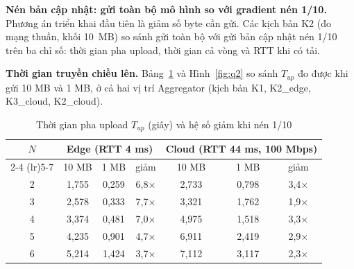 \textbf{Nén bản cập nhật: gửi toàn bộ mô hình so với gradient nén 1/10.} Phương án triển khai đầu tiên là giảm số byte cần gửi. Các kịch bản K2 (đo mạng thuần, khối 10~MB) so sánh gửi toàn bộ với gửi bản cập nhật nén 1/10 trên ba chỉ số: thời gian pha upload, thời gian cả vòng và RTT khi có tải.

\textbf{Thời gian truyền chiều lên.} Bảng~\ref{tab:q2meas} và Hình~\ref{fig:q2} so sánh $T_{up}$ đo được khi gửi 10 MB và 1 MB, ở cả hai vị trí Aggregator (kịch bản K1, K2\_edge, K3\_cloud, K2\_cloud).

\begin{table}[H]
    \centering
    \caption{Thời gian pha upload $T_{up}$ (giây) và hệ số giảm khi nén 1/10}
    \label{tab:q2meas}
    \begin{tabular}{c c c c c c c}
        \toprule
        \multirow{2}{*}{$N$} & \multicolumn{3}{c}{\textbf{Edge (RTT 4 ms)}} & \multicolumn{3}{c}{\textbf{Cloud (RTT 44 ms, 100 Mbps)}} \\
        \cmidrule(lr){2-4} \cmidrule(lr){5-7}
        & 10 MB & 1 MB & giảm & 10 MB & 1 MB & giảm \\
        \midrule
        2 & 1,755 & 0,259 & 6,8$\times$ & 2,733 & 0,798 & 3,4$\times$ \\
        3 & 2,578 & 0,333 & 7,7$\times$ & 3,321 & 1,762 & 1,9$\times$ \\
        4 & 3,374 & 0,481 & 7,0$\times$ & 4,975 & 1,518 & 3,3$\times$ \\
        5 & 4,235 & 0,901 & 4,7$\times$ & 6,911 & 2,419 & 2,9$\times$ \\
        6 & 5,214 & 1,424 & 3,7$\times$ & 7,112 & 3,117 & 2,3$\times$ \\
        \bottomrule
    \end{tabular}
\end{table}

